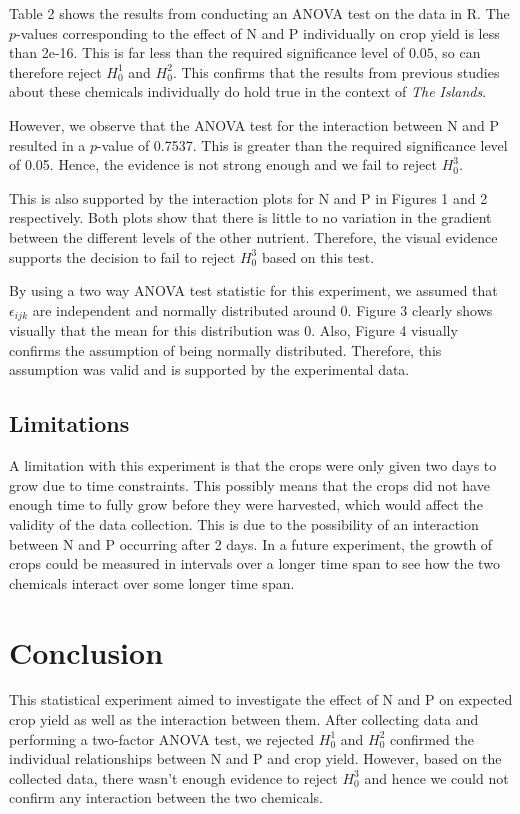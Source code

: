 \documentclass[12pt]{article}
\begin{document}
Table 2 shows the results from conducting an ANOVA test on the data in R.
The $p$-values corresponding to the effect of N and P individually on crop yield is less than 2e-16.
This is far less than the required significance level of $0.05$, so can therefore reject $H^1_0$ and $H^2_0$.
This confirms that the results from previous studies about these chemicals individually do hold true in the context of \textit{The Islands}.

However, we observe that the ANOVA test for the interaction between N and P resulted in a $p$-value of 0.7537.
This is greater than the required significance level of 0.05.
Hence, the evidence is not strong enough and we fail to reject $H^3_0$.

This is also supported by the interaction plots for N and P in Figures 1 and 2 respectively.
Both plots show that there is little to no variation in the gradient between the different levels of the other nutrient.
Therefore, the visual evidence supports the decision to fail to reject $H^3_0$ based on this test.

By using a two way ANOVA test statistic for this experiment, we assumed that
$\epsilon_{ijk}$ are independent and normally distributed around 0.
Figure 3 clearly shows visually that the mean for this distribution was 0.
Also, Figure 4 visually confirms the assumption of being normally distributed. Therefore, this assumption was valid and is supported by the experimental data.

\subsection{Limitations}

A limitation with this experiment is that the crops were only given two days to grow due to time constraints.
This possibly means that the crops did not have enough time to fully grow before they were harvested, which would affect the validity of the data collection.
This is due to the possibility of an interaction between N and P occurring after 2 days.
In a future experiment, the growth of crops could be measured in intervals over a longer time span to see how the two chemicals interact over some longer time span.

\section{Conclusion}

This statistical experiment aimed to investigate the effect of N and P on expected crop yield as well as the interaction between them.
After collecting data and performing a two-factor ANOVA test, we rejected $H^1_0$ and $H^2_0$ confirmed the individual relationships between N and P and crop yield.
However, based on the collected data, there wasn't enough evidence to reject $H^3_0$ and hence we could not confirm any interaction between the two chemicals.
\end{document}
